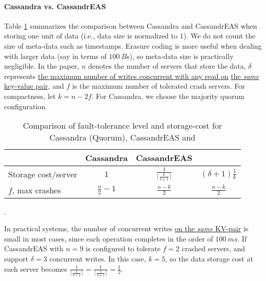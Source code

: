 \paragraph*{Cassandra vs. CassandrEAS}
Table \ref{t:comparison} summarizes the comparison between Cassandra and CassandrEAS when storing one unit of data (i.e., data size is normalized to $1$). We do not count the size of meta-data such as timestamps. Erasure coding is more useful when dealing with larger data (say in terms of $100~B$s), so meta-data size is practically negligible. 
In the paper, $n$ denotes the number of servers that store the data, $\delta$ represents \underline{the maximum number of writes concurrent with any read on} \underline{the \textit{same} key-value pair}, and $f$ is the maximum number of tolerated crash servers.
For compactness, let $k = n-2f$. For Cassandra, we choose the majority quorum configuration.

\begin{table}[h]
	\centering
	\begin{tabular}{ l|c|c|c}
		& Cassandra &  CassandrEAS  & \treas\\ \hline
		Storage cost/server & $1$ &  $\frac{1}{ \lceil\frac{k}{\delta+1}\rceil}$ 
		& $(\delta +1)\frac{1}{k}$ \\
	
		$f$, max crashes & $\frac{n}{2} - 1$  &  $\frac{n-k}{2}$ & $\frac{n-k}{2}$ \\%
	\end{tabular}
	\caption{Comparison of fault-tolerance level and storage-cost for Cassandra (Quorum), CassandrEAS and \treas}.
	\label{t:comparison}
\end{table}

In practical systems, the number of concurrent writes \underline{on the \textit{same} KV-pair} is small in most cases, since each operation completes in the order of $100~ms$. If CassandrEAS with $n=9$ is configured to tolerate $f=2$ crashed servers, and support $\delta = 3$ concurrent writes. In this case, $k = 5$, so the data storage cost at each server becomes
$\frac{1}{ \lceil\frac{k}{\delta+1}\rceil} = \frac{1}{ \lceil\frac{5}{3+1}\rceil} = \frac{1}{2}$.

